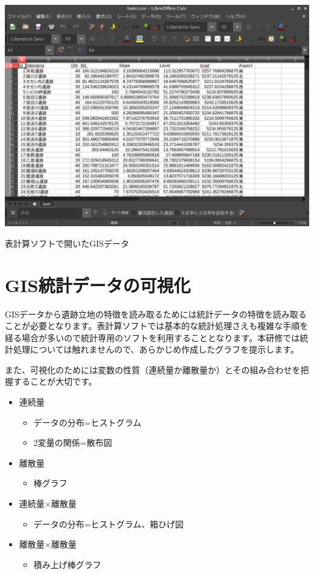 \documentclass[14Q,twocolumn]{jsarticle}
\makeatletter
\newenvironment{figurehere}
  {\def\@captype{figure}}
  {}
\makeatother
\begin{document}
\begin{figurehere}
\centering
\includegraphics[width=\linewidth]{49.png}
\caption{表計算ソフトで開いたGISデータ}
\end{figurehere}

\section{GIS統計データの可視化}
GISデータから遺跡立地の特徴を読み取るためには統計データの特徴を読み取ることが必要となります。表計算ソフトでは基本的な統計処理さえも複雑な手順を経る場合が多いので統計専用のソフトを利用することとなります。本研修では統計処理については触れませんので、あらかじめ作成したグラフを提示します。

また、可視化のためには変数の性質（連続量か離散量か）とその組み合わせを把握することが大切です。

\begin{itemize}
\item 連続量
	\begin{itemize}
	\item データの分布=ヒストグラム
	\item 2変量の関係=散布図
	\end{itemize}
\item 離散量
	\begin{itemize}
	\item 棒グラフ
	\end{itemize}
\item 連続量×離散量
	\begin{itemize}
	\item データの分布=ヒストグラム、箱ひげ図
	\end{itemize}
\item 離散量×離散量
	\begin{itemize}
	\item 積み上げ棒グラフ
	\end{itemize}
\end{itemize}
\end{document}
